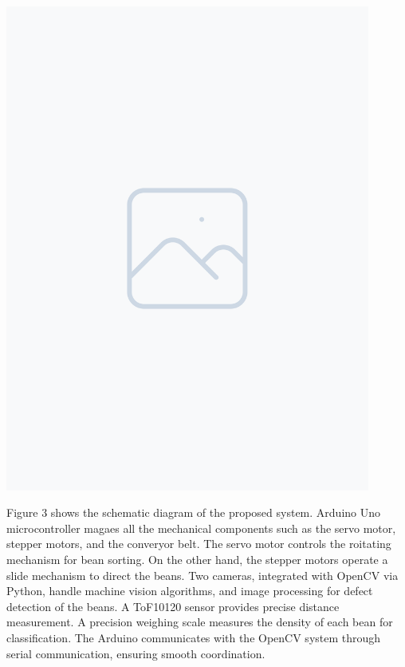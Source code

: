 \includegraphics[width=0.9\textwidth]{figure/placeholder.png} 

Figure 3 shows the schematic diagram of the proposed system. Arduino Uno microcontroller magaes all the mechanical components such as the servo motor, stepper motors, and the converyor belt. The servo motor controls the  roitating mechanism for bean sorting. On the other hand, the stepper motors operate a slide mechanism to direct the beans. Two cameras, integrated with OpenCV via Python, handle machine vision algorithms, and image processing for defect detection of the beans. A ToF10120 sensor provides precise distance measurement. A precision weighing scale measures the density of each bean for classification. The Arduino communicates with the OpenCV system through serial communication, ensuring smooth coordination.

